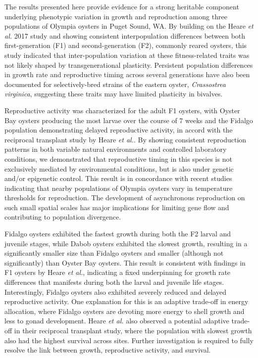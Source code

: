 \documentclass[fleqn,10pt]{wlscirep}
\begin{document}
The results presented here provide evidence for a strong heritable component underlying phenotypic variation in growth and reproduction among three populations of Olympia oysters in Puget Sound, WA. By building on the Heare \textit{et al.} 2017 study and showing consistent interpopulation differences between both first-generation (F1) and second-generation (F2), commonly reared oysters, this study indicated that inter-population variation at these fitness-related traits was not likely shaped by transgenerational plasticity. Persistent population differences in growth rate and reproductive timing across several generations have also been documented for selectively-bred strains of the eastern oyster, \textit{Crassostrea virginica}\cite{Dittman1998-xm,Barber1991-og}, suggesting these traits may have limited plasticity in bivalves.\par
Reproductive activity was characterized for the adult F1 oysters, with Oyster Bay oysters producing the most larvae over the course of 7 weeks and the Fidalgo population demonstrating delayed reproductive activity, in accord with the reciprocal transplant study by Heare \textit{et al.}. By showing consistent reproduction patterns in both variable natural environments and controlled laboratory conditions, we demonstrated that reproductive timing in this species is not exclusively mediated by environmental conditions, but is also under genetic and/or epigenetic control. This result is in concordance with recent studies indicating that nearby populations of Olympia oysters vary in temperature thresholds for reproduction\cite{Barber2016-ws,Seale2009-uw}. The development of asynchronous reproduction on such small spatial scales has major implications for limiting gene flow and contributing to population divergence\cite{Palumbi1994-rv}.\par
Fidalgo oysters exhibited the fastest growth during both the F2 larval and juvenile stages, while Dabob oysters exhibited the slowest growth, resulting in a significantly smaller size than Fidalgo oysters and smaller (although not significantly) than Oyster Bay oysters. This result is consistent with findings in F1 oysters by Heare \textit{et al.}, indicating a fixed underpinning for growth rate differences that manifests during both the larval and juvenile life stages. Interestingly, Fidalgo oysters also exhibited severely reduced and delayed reproductive activity. One explanation for this is an adaptive trade-off in energy allocation\cite{Perrin1993-wa,Folkvord2014-jj}, where Fidalgo oysters are devoting more energy to shell growth and less to gonad development. Heare \textit{et al.} also observed a potential adaptive trade-off in their reciprocal transplant study, where the population with slowest growth also had the highest survival across sites. Further investigation is required to fully resolve the link between growth, reproductive activity, and survival.\par
\end{document}
